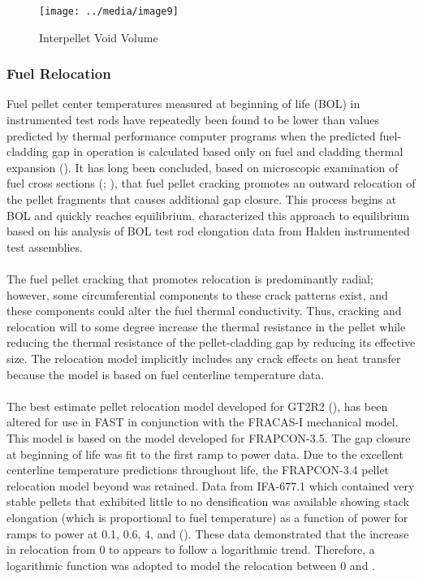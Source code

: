 \begin{figure}
    \texttt{[image: ../media/image9]}
    \caption{Interpellet Void Volume}
    \label{fig:interpellet_void_volume}
\end{figure}

\subsubsection*{Fuel Relocation}\label{section:fuel-relocation}

Fuel pellet center temperatures measured at beginning of life (BOL) in instrumented test rods have
repeatedly been found to be lower than values predicted by thermal performance computer programs
when the predicted fuel-cladding gap in operation is calculated based only on fuel and cladding
thermal expansion (\cite{ref:Lanning1982}). It has long been concluded, based on
microscopic examination of fuel cross sections (\cite{ref:Galbraith1973};
\cite{ref:Cunningham1984}), that fuel pellet cracking promotes an outward
relocation of the pellet fragments that causes additional gap closure. This process begins at BOL
and quickly reaches equilibrium. \cite{ref:Oguma1983} characterized this approach to
equilibrium based on his analysis of BOL test rod elongation data from Halden instrumented test
assemblies.
\\
\\
The fuel pellet cracking that promotes relocation is predominantly radial; however, some
circumferential components to these crack patterns exist, and these components could alter the fuel
thermal conductivity.  Thus, cracking and relocation will to some degree increase the thermal
resistance in the pellet while reducing the thermal resistance of the pellet-cladding gap by
reducing its effective size. The relocation model implicitly includes any crack effects on heat
transfer because the model is based on fuel centerline temperature data.
\\
\\
The best estimate pellet relocation model developed for GT2R2 (\cite{ref:Cunningham1984}), has been
altered for use in FAST in conjunction with the FRACAS-I mechanical model.  This model is based on
the model developed for FRAPCON-3.5. The gap closure at beginning of life was fit to the first ramp
to power data. Due to the excellent centerline temperature predictions throughout life, the
FRAPCON-3.4 pellet relocation model beyond  was retained.  Data from IFA-677.1
which contained very stable pellets that exhibited little to no densification was available showing
stack elongation (which is proportional to fuel temperature) as a function of power for ramps to
power at 0.1, 0.6, 4, and  (\cite{ref:Therache2005b}).  These data
demonstrated that the increase in relocation from 0 to  appears to follow a
logarithmic trend. Therefore, a logarithmic function was adopted to model the relocation between 0
and .


